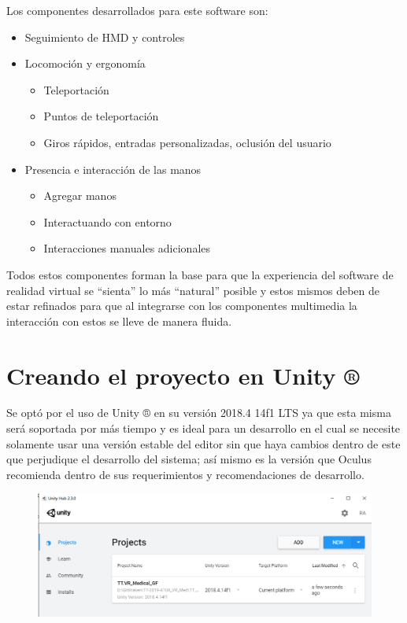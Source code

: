 Los componentes desarrollados para este software son:\\
\begin{itemize}
    \item Seguimiento de HMD y controles
    \item Locomoción y ergonomía
    \begin{itemize}
        \item Teleportación
        \item Puntos de teleportación
        \item Giros rápidos, entradas personalizadas, oclusión del usuario
    \end{itemize}
    \item Presencia e interacción de las manos
    \begin{itemize}
        \item Agregar manos
        \item Interactuando con entorno
        \item Interacciones manuales adicionales
    \end{itemize}
\end{itemize}
Todos estos componentes forman la base para que la experiencia del software de realidad virtual se “sienta” lo más “natural” posible y estos mismos deben de estar refinados para que al integrarse con los componentes multimedia la interacción con estos se lleve de manera fluida.\\

\section{Creando el proyecto en Unity ®}
Se optó por el uso de Unity ® en su versión 2018.4 14f1 LTS  ya que esta misma será soportada por más tiempo y es ideal para un desarrollo en el cual se necesite solamente usar una versión estable del editor sin que haya cambios dentro de este que perjudique el desarrollo del sistema; así mismo es la versión que Oculus\cite{web15} recomienda dentro de sus requerimientos y recomendaciones de desarrollo.\\
\begin{figure}[H]
	\begin{center}
 		\includegraphics[width = 1\textwidth]{source/images/image51.png}
	\end{center} 
\end{figure}

